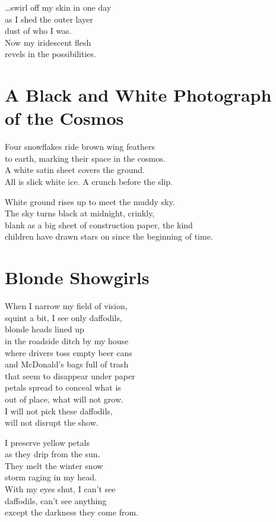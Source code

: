 \documentclass[twoside,10pt]{book}
\begin{document}
\ldots swirl off my skin in one day\\
as I shed the outer layer\\
dust of who I was.\\
Now my iridescent flesh\\
revels in the possibilities.

\clearpage
\section{A Black and White Photograph\\ of the Cosmos}

Four snowflakes ride brown wing feathers\\
to earth, marking their space in the cosmos.\\
A white satin sheet covers the ground.\\
All is slick white ice. A crunch before the slip.

White ground rises up to meet the muddy sky.\\
The sky turns black at midnight, crinkly,\\
blank as a big sheet of construction paper, the kind\\
children have drawn stars on since the beginning of time.


\clearpage
\section{Blonde Showgirls}

When I narrow my field of vision,\\
squint a bit, I see only daffodils,\\
blonde heads lined up\\
in the roadside ditch by my house\\
where drivers toss empty beer cans\\
and McDonald's bags full of trash\\
that seem to disappear under paper\\
petals spread to conceal what is\\
out of place, what will not grow.\\
I will not pick these daffodils,\\
will not disrupt the show.

I preserve yellow petals\\
as they drip from the sun.\\
They melt the winter snow\\
storm raging in my head.\\
With my eyes shut, I can't see\\
daffodils, can't see anything\\
except the darkness they come from.
\end{document}
